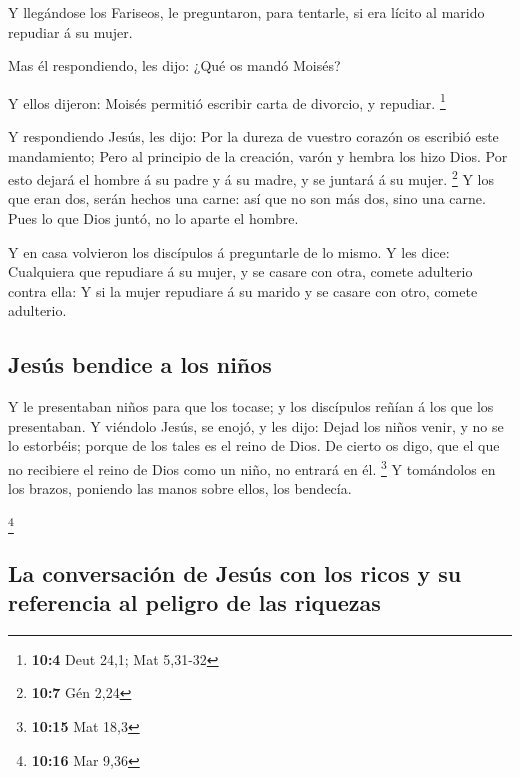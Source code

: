  Y llegándose los Fariseos, le preguntaron, para tentarle,
si era lícito al marido repudiar á su mujer.

 Mas él respondiendo, les dijo: ¿Qué os mandó Moisés?

 Y ellos dijeron: Moisés permitió escribir carta de
divorcio, y repudiar. \footnote{\textbf{10:4} Deut 24,1; Mat 5,31-32}

 Y respondiendo Jesús, les dijo: Por la dureza de vuestro
corazón os escribió este mandamiento;  Pero al principio
de la creación, varón y hembra los hizo Dios.  Por esto
dejará el hombre á su padre y á su madre, y se juntará á su mujer.
\footnote{\textbf{10:7} Gén 2,24}  Y los que eran dos,
serán hechos una carne: así que no son más dos, sino una carne.
 Pues lo que Dios juntó, no lo aparte el hombre.

 Y en casa volvieron los discípulos á preguntarle de lo
mismo.  Y les dice: Cualquiera que repudiare á su mujer,
y se casare con otra, comete adulterio contra ella:  Y si
la mujer repudiare á su marido y se casare con otro, comete adulterio.

\hypertarget{jesuxfas-bendice-a-los-niuxf1os}{%
\subsection{Jesús bendice a los
niños}\label{jesuxfas-bendice-a-los-niuxf1os}}

 Y le presentaban niños para que los tocase; y los
discípulos reñían á los que los presentaban.  Y viéndolo
Jesús, se enojó, y les dijo: Dejad los niños venir, y no se lo
estorbéis; porque de los tales es el reino de Dios.  De
cierto os digo, que el que no recibiere el reino de Dios como un niño,
no entrará en él. \footnote{\textbf{10:15} Mat 18,3}  Y
tomándolos en los brazos, poniendo las manos sobre ellos, los bendecía.

\footnote{\textbf{10:16} Mar 9,36}

\hypertarget{la-conversaciuxf3n-de-jesuxfas-con-los-ricos-y-su-referencia-al-peligro-de-las-riquezas}{%
\subsection{La conversación de Jesús con los ricos y su referencia al
peligro de las
riquezas}\label{la-conversaciuxf3n-de-jesuxfas-con-los-ricos-y-su-referencia-al-peligro-de-las-riquezas}}

